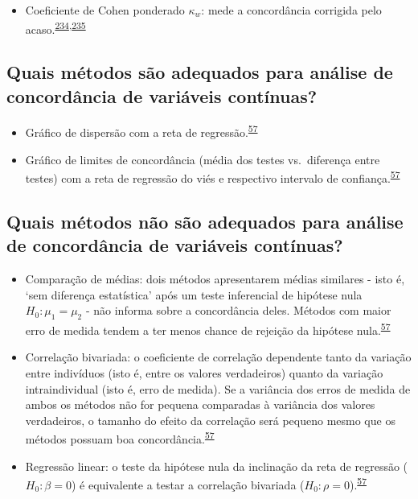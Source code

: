 \documentclass[
  a4paper,
]{book}
\providecommand{\tightlist}{%
  \setlength{\itemsep}{0pt}\setlength{\parskip}{0pt}}
\begin{document}
\begin{itemize}
\tightlist
\item
  Coeficiente de Cohen ponderado \(\kappa_{w}\): mede a concordância corrigida pelo acaso.\textsuperscript{\protect\hyperlink{ref-scott1955}{234},\protect\hyperlink{ref-cohen1960}{235}}
\end{itemize}

\hypertarget{quais-muxe9todos-suxe3o-adequados-para-anuxe1lise-de-concorduxe2ncia-de-variuxe1veis-contuxednuas}{%
\subsection{Quais métodos são adequados para análise de concordância de variáveis contínuas?}\label{quais-muxe9todos-suxe3o-adequados-para-anuxe1lise-de-concorduxe2ncia-de-variuxe1veis-contuxednuas}}

\begin{itemize}
\item
  Gráfico de dispersão com a reta de regressão.\textsuperscript{\protect\hyperlink{ref-altman1983}{57}}
\item
  Gráfico de limites de concordância (média dos testes vs.~diferença entre testes) com a reta de regressão do viés e respectivo intervalo de confiança.\textsuperscript{\protect\hyperlink{ref-altman1983}{57}}
\end{itemize}

\hypertarget{quais-muxe9todos-nuxe3o-suxe3o-adequados-para-anuxe1lise-de-concorduxe2ncia-de-variuxe1veis-contuxednuas}{%
\subsection{Quais métodos não são adequados para análise de concordância de variáveis contínuas?}\label{quais-muxe9todos-nuxe3o-suxe3o-adequados-para-anuxe1lise-de-concorduxe2ncia-de-variuxe1veis-contuxednuas}}

\begin{itemize}
\item
  Comparação de médias: dois métodos apresentarem médias similares - isto é, `sem diferença estatística' após um teste inferencial de hipótese nula \(H_{0}:\mu_{1} = \mu_{2}\) - não informa sobre a concordância deles. Métodos com maior erro de medida tendem a ter menos chance de rejeição da hipótese nula.\textsuperscript{\protect\hyperlink{ref-altman1983}{57}}
\item
  Correlação bivariada: o coeficiente de correlação dependente tanto da variação entre indivíduos (isto é, entre os valores verdadeiros) quanto da variação intraindividual (isto é, erro de medida). Se a variância dos erros de medida de ambos os métodos não for pequena comparadas à variância dos valores verdadeiros, o tamanho do efeito da correlação será pequeno mesmo que os métodos possuam boa concordância.\textsuperscript{\protect\hyperlink{ref-altman1983}{57}}
\item
  Regressão linear: o teste da hipótese nula da inclinação da reta de regressão (\(H_{0}:\beta = 0\)) é equivalente a testar a correlação bivariada (\(H_{0}:\rho = 0\)).\textsuperscript{\protect\hyperlink{ref-altman1983}{57}}
\end{itemize}
\end{document}
